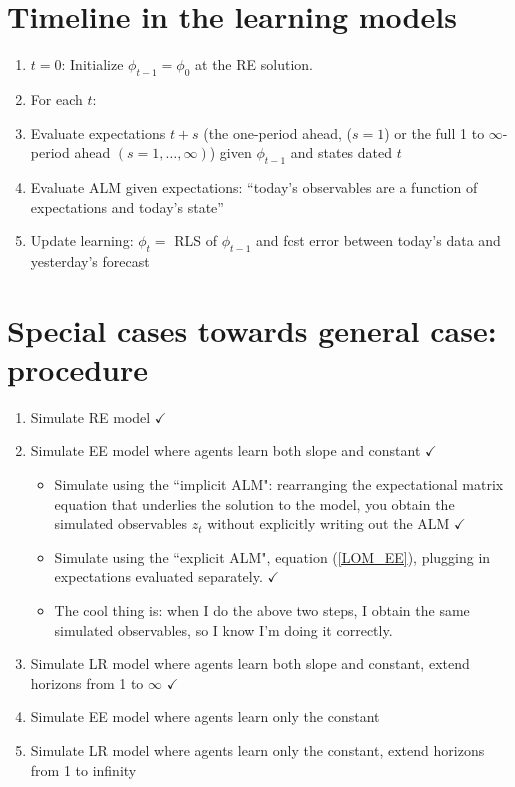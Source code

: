\documentclass[11pt]{article}
\renewcommand{\[}{\begin{equation}}
\renewcommand{\]}{\end{equation}}
\begin{document}
\section{Timeline in the learning models}
\begin{enumerate}
\item[] \underline{$t=0$}: Initialize $\phi_{t-1} = \phi_0$ at the RE solution.
\item[] For each $t$:
\item Evaluate expectations $t+s$ (the one-period ahead, ($s=1$) or the full 1 to $\infty$-period ahead $(s=1,\dots, \infty)$) given $\phi_{t-1}$ and states dated $t$
\item Evaluate ALM given expectations: ``today's observables are a function of expectations and today's state''
\item Update learning: $\phi_t = $ RLS of $\phi_{t-1}$ and fcst error between today's data and yesterday's forecast
\end{enumerate}

\section{Special cases towards general case: procedure}
\begin{enumerate}
\item Simulate RE model $\checkmark$
\item Simulate EE model where agents learn both slope and constant $\checkmark$
	\begin{itemize}
	\item Simulate using the ``implicit ALM": rearranging the expectational matrix equation that underlies the solution to the model, you obtain the simulated observables $z_t$ without explicitly writing out the ALM $\checkmark$
	\item Simulate using the ``explicit ALM", equation (\ref{LOM_EE}), plugging in expectations evaluated separately. $\checkmark$
	\item[] The cool thing is: when I do the above two steps, I obtain the same simulated observables, so I know I'm doing it correctly.
 	\end{itemize}
\item Simulate LR model where agents learn both slope and constant, extend horizons from 1 to $\infty$ $\checkmark$
\item Simulate EE model where agents learn only the constant
\item Simulate LR model where agents learn only the constant, extend horizons from 1 to infinity
\end{enumerate}
\end{document}
